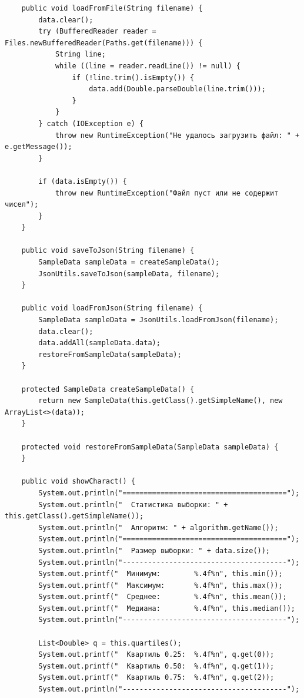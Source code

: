 \begin{verbatim}
    public void loadFromFile(String filename) {
        data.clear();
        try (BufferedReader reader = Files.newBufferedReader(Paths.get(filename))) {
            String line;
            while ((line = reader.readLine()) != null) {
                if (!line.trim().isEmpty()) {
                    data.add(Double.parseDouble(line.trim()));
                }
            }
        } catch (IOException e) {
            throw new RuntimeException("Не удалось загрузить файл: " + e.getMessage());
        }

        if (data.isEmpty()) {
            throw new RuntimeException("Файл пуст или не содержит чисел");
        }
    }

    public void saveToJson(String filename) {
        SampleData sampleData = createSampleData();
        JsonUtils.saveToJson(sampleData, filename);
    }

    public void loadFromJson(String filename) {
        SampleData sampleData = JsonUtils.loadFromJson(filename);
        data.clear();
        data.addAll(sampleData.data);
        restoreFromSampleData(sampleData);
    }

    protected SampleData createSampleData() {
        return new SampleData(this.getClass().getSimpleName(), new ArrayList<>(data));
    }

    protected void restoreFromSampleData(SampleData sampleData) {
    }

    public void showCharact() {
        System.out.println("=======================================");
        System.out.println("  Статистика выборки: " + this.getClass().getSimpleName());
        System.out.println("  Алгоритм: " + algorithm.getName());
        System.out.println("=======================================");
        System.out.println("  Размер выборки: " + data.size());
        System.out.println("---------------------------------------");
        System.out.printf("  Минимум:        %.4f%n", this.min());
        System.out.printf("  Максимум:       %.4f%n", this.max());
        System.out.printf("  Среднее:        %.4f%n", this.mean());
        System.out.printf("  Медиана:        %.4f%n", this.median());
        System.out.println("---------------------------------------");

        List<Double> q = this.quartiles();
        System.out.printf("  Квартиль 0.25:  %.4f%n", q.get(0));
        System.out.printf("  Квартиль 0.50:  %.4f%n", q.get(1));
        System.out.printf("  Квартиль 0.75:  %.4f%n", q.get(2));
        System.out.println("---------------------------------------");


\end{verbatim}
